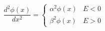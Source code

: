 \begin{equation}
  \label{5.19}
  \frac{d^2\phi(x)}{dx^2} =
  \left\{
  \begin{array}{lc}
    \alpha^2 \phi(x) & E < 0
    \\
    \beta^2  \phi(x) & E > 0
  \end{array}
  \right.
\end{equation}









